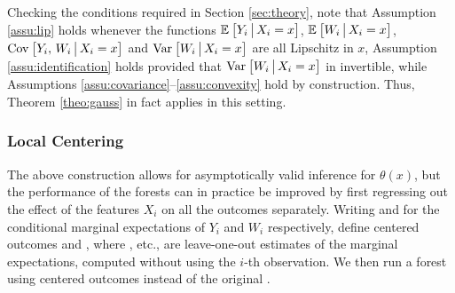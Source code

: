 \documentclass[aos]{imsart}
\theoremstyle{plain}
\theoremstyle{definition}
\theoremstyle{remark}
\begin{document}
\begin{CJK}{UTF8}{gbsn}
{Checking the conditions required in Section \ref{sec:theory}, note that
Assumption \ref{assu:lip} holds whenever the functions $\mathbb{E}_{}\left[Y_i \,\big|\, X_i = x\right]$, 
$\mathbb{E}_{}\left[W_i \,\big|\, X_i = x\right]$, $\operatorname{Cov}_{}\left[Y_i, \, W_i \,\big|\, X_i = x\right]$ and $\operatorname{Var}_{}\left[W_i \,\big|\, X_i = x\right]$
are all Lipschitz in $x$, Assumption \ref{assu:identification} holds provided that
$\operatorname{Var}_{}\left[W_i \,\big|\, X_i = x\right]$ in invertible, while Assumptions \ref{assu:covariance}--\ref{assu:convexity}
hold by construction. Thus, Theorem \ref{theo:gauss} in fact applies in this setting.

\subsubsection{Local Centering}
\label{sec:precompute}

The above construction allows for asymptotically valid inference for $\theta(x)$,
but the performance of the forests can in practice
be improved by first regressing out the effect of the features $X_i$ on all the
outcomes separately. Writing
 and 
for the conditional marginal expectations of $Y_i$ and $W_i$ respectively,
define centered outcomes
 and ,
where , etc., are leave-one-out estimates of the marginal expectations,
computed without using the $i$-th observation.
We then run a forest using centered outcomes
 instead of the original
.

}
\end{CJK}
\end{document}

